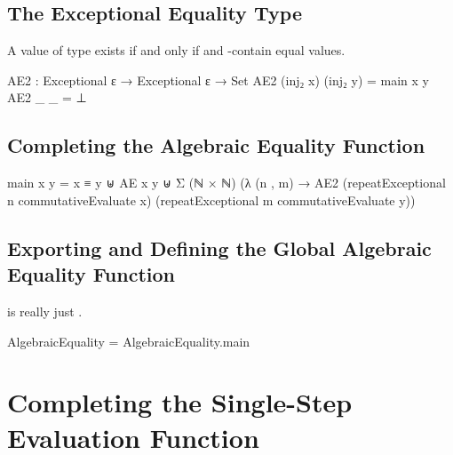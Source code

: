 \documentclass{report}
\begin{document}
\subsection{The Exceptional Equality Type}
A value of type    exists if and only if  and  -contain equal values.

\begin{code}
  AE2 : Exceptional ε → Exceptional ε → Set
  AE2 (inj₂ x) (inj₂ y) = main x y
  AE2 _ _ = ⊥
\end{code}

\subsection{Completing the Algebraic Equality Function}

\begin{code}
  main x y =
    x ≡ y ⊎
    AE x y ⊎
    Σ (ℕ × ℕ) (λ (n , m) → AE2 (repeatExceptional n commutativeEvaluate x)
                               (repeatExceptional m commutativeEvaluate y))
\end{code}

\subsection{Exporting and Defining the Global Algebraic Equality Function}
 is really just .

\begin{code}
AlgebraicEquality = AlgebraicEquality.main
\end{code}

\section{Completing the Single-Step Evaluation Function}
\end{document}
